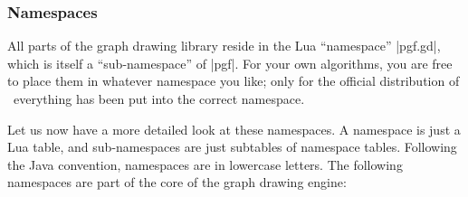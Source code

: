\label{section-gd-namespaces}

\subsubsection{Namespaces}

All parts of the graph drawing library reside in the Lua ``namespace''
|pgf.gd|, which is itself a ``sub-namespace'' of |pgf|. For your own
algorithms, you are free to place them in whatever namespace you like;
only for the official distribution of \pgfname\ everything has been
put into the correct namespace.

Let us now have a more detailed look at these namespaces. A namespace
is just a Lua table, and sub-namespaces are just subtables of
namespace tables. Following the Java convention, namespaces are in
lowercase letters. The following namespaces are part of the core of
the graph drawing engine:
